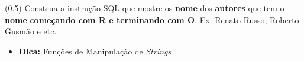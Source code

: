 \documentclass[12pt]{exam}
\begin{document}
\begin{questions}


\question (0.5)  Construa a instrução SQL que mostre os \textbf{nome} dos \textbf{autores} que tem o \textbf{nome} \textbf{começando com R e terminando com O}. Ex: Renato Russo, Roberto Gusmão e etc.

\begin{itemize}
    \item \textbf{Dica:} Funções de Manipulação de \textit{Strings}
\end{itemize}









\end{questions}
\end{document}
